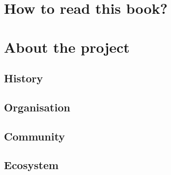 \chapter{How to read this book?}
\chapter{About the project}
\section{History}
\section{Organisation}
\section{Community}
\section{Ecosystem}
